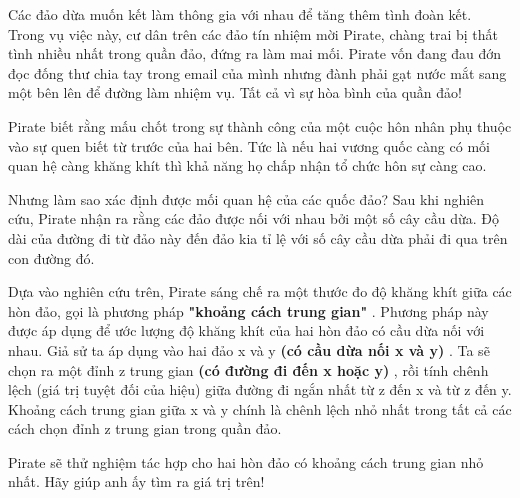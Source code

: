 Các đảo dừa muốn kết làm thông gia với nhau để tăng thêm tình đoàn kết. Trong vụ việc này, cư dân trên các đảo tín nhiệm mời Pirate, chàng trai bị thất tình nhiều nhất trong quần đảo, đứng ra làm mai mối. Pirate vốn đang đau đớn đọc đống thư chia tay trong email của mình nhưng đành phải gạt nước mắt sang một bên lên để đường làm nhiệm vụ. Tất cả vì sự hòa bình của quần đảo!  

   Pirate biết rằng mấu chốt trong sự thành công của một cuộc hôn nhân phụ thuộc vào sự quen biết từ trước của hai bên. Tức là nếu hai vương quốc càng có mối quan hệ càng khăng khít thì khả năng họ chấp nhận tổ chức hôn sự càng cao.  

   Nhưng làm sao xác định được mối quan hệ của các quốc đảo? Sau khi nghiên cứu, Pirate nhận ra rằng các đảo được nối với nhau bởi một số cây cầu dừa. Độ dài của đường đi từ đảo này đến đảo kia tỉ lệ với số cây cầu dừa phải đi qua trên con đường đó.  

   Dựa vào nghiên cứu trên, Pirate sáng chế ra một thước đo độ khăng khít giữa các hòn đảo, gọi là phương pháp   \textbf{    "khoảng cách trung gian"   }   . Phương pháp này được áp dụng để ước lượng độ khăng khít của hai hòn đảo có cầu dừa nối với nhau. Giả sử ta áp dụng vào hai đảo x và y   \textbf{    (có cầu dừa nối x và y)   }   . Ta sẽ chọn ra một đỉnh z trung gian   \textbf{    (có đường đi đến x hoặc y)   }   , rồi tính chênh lệch (giá trị tuyệt đối của hiệu) giữa đường đi ngắn nhất từ z đến x và từ z đến y. Khoảng cách trung gian giữa x và y chính là chênh lệch nhỏ nhất trong tất cả các cách chọn đỉnh z trung gian trong quần đảo.  

   Pirate sẽ thử nghiệm tác hợp cho hai hòn đảo có khoảng cách trung gian nhỏ nhất. Hãy giúp anh ấy tìm ra giá trị trên!